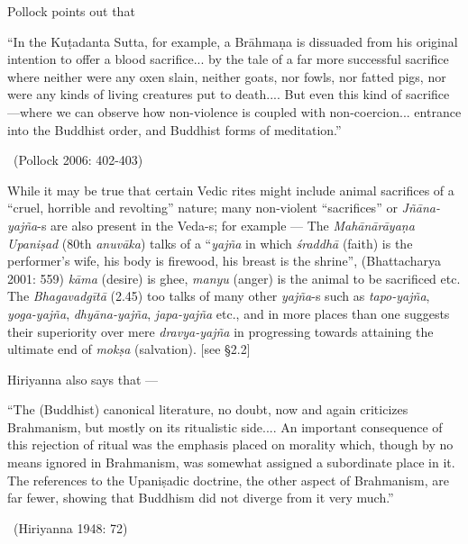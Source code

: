 Pollock points out that

\begin{myquote}
“In the Kuṭadanta Sutta, for example, a Brāhmaṇa is dissuaded from his original intention to offer a blood sacrifice... by the tale of a far more successful sacrifice where neither were any oxen slain, neither goats, nor fowls, nor fatted pigs, nor were any kinds of living creatures put to death.... But even this kind of sacrifice—where we can observe how non-violence is coupled with non-coercion... entrance into the Buddhist order, and Buddhist forms of meditation.” 

~\hfill (Pollock 2006: 402-403)
\end{myquote}

While it may be true that certain Vedic rites might include animal sacrifices of a “cruel, horrible and revolting” nature; many non-violent “sacrifices” or \textit{Jñāna-yajña}-s are also present in the Veda-s; for example — The \textit{Mahānārāyaṇa Upaniṣad} (80th \textit{anuvāka}) talks of a ``\textit{yajña} in which \textit{śraddhā} (faith) is the performer’s wife, his body is firewood, his breast is the shrine”, (Bhattacharya 2001: 559) \textit{kāma }(desire) is ghee, \textit{manyu} (anger) is the animal to be sacrificed etc. The \textit{Bhagavadgītā} (2.45) too talks of many other \textit{yajña}-s such as \textit{tapo-yajña}, \textit{yoga-yajña}, \textit{dhyāna-yajña}, \textit{japa-yajña} etc., and in more places than one suggests their superiority over mere \textit{dravya-yajña} in progressing towards attaining the ultimate end of \textit{mokṣa} (salvation). [see §2.2]

Hiriyanna also says that —

\begin{myquote}
“The (Buddhist) canonical literature, no doubt, now and again criticizes Brahmanism, but mostly on its ritualistic side.... An important consequence of this rejection of ritual was the emphasis placed on morality which, though by no means ignored in Brahmanism, was somewhat assigned a subordinate place in it. The references to the Upaniṣadic doctrine, the other aspect of Brahmanism, are far fewer, showing that Buddhism did not diverge from it very much.” 

~\hfill (Hiriyanna 1948: 72)
\end{myquote}

